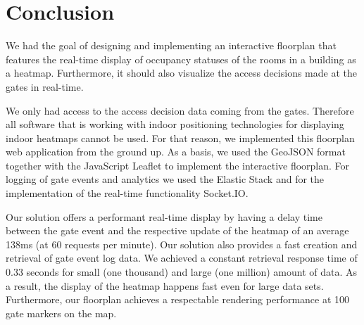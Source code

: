 \section{Conclusion}
We had the goal of designing and implementing an interactive floorplan that features the real-time display of occupancy statuses of the rooms in a building as a heatmap. Furthermore, it should also visualize the access decisions made at the gates in real-time. 

We only had access to the access decision data coming from the gates. Therefore all software that is working with indoor positioning technologies for displaying indoor heatmaps cannot be used. For that reason, we implemented this floorplan web application from the ground up. As a basis, we used the GeoJSON format together with the JavaScript Leaflet to implement the interactive floorplan. For logging of gate events and analytics we used the Elastic Stack and for the implementation of the real-time functionality Socket.IO. 

Our solution offers a performant real-time display by having a delay time between the gate event and the respective update of the heatmap of an average 138ms (at 60 requests per minute).
Our solution also provides a fast creation and retrieval of gate event log data. We achieved a constant retrieval response time of 0.33 seconds for small (one thousand) and large (one million) amount of data. As a result, the display of the heatmap happens fast even for large data sets. Furthermore, our floorplan achieves a respectable rendering performance at 100 gate markers on the map.

\clearpage



